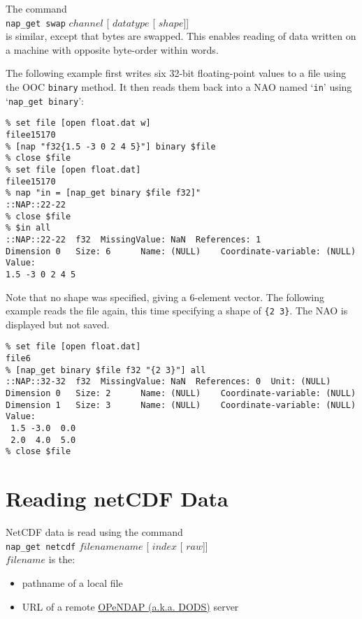The command
  \\
  \texttt{nap\_get swap} 
  $channel$ [
  $datatype$ [
  $shape$]]
  \\is similar, except that bytes are swapped. This enables reading
  of data written on a machine with opposite byte-order within
  words.
  

The following example first writes six 32-bit floating-point
  values to a file using the OOC 
  \texttt{binary} method. It then reads them back into a NAO named
  `\texttt{in}' using `\texttt{nap\_get binary}':
  \begin{verbatim}
% set file [open float.dat w]
filee15170
% [nap "f32{1.5 -3 0 2 4 5}"] binary $file
% close $file
% set file [open float.dat]
filee15170
% nap "in = [nap_get binary $file f32]"
::NAP::22-22
% close $file
% $in all
::NAP::22-22  f32  MissingValue: NaN  References: 1
Dimension 0   Size: 6      Name: (NULL)    Coordinate-variable: (NULL)
Value:
1.5 -3 0 2 4 5
\end{verbatim}

Note that no shape was specified, giving a 6-element vector. The
following example reads the file again, this time specifying a shape of
  \texttt{\{2 3\}}. The NAO is displayed but not saved.
  \begin{verbatim}
% set file [open float.dat]
file6
% [nap_get binary $file f32 "{2 3}"] all
::NAP::32-32  f32  MissingValue: NaN  References: 0  Unit: (NULL)
Dimension 0   Size: 2      Name: (NULL)    Coordinate-variable: (NULL)
Dimension 1   Size: 3      Name: (NULL)    Coordinate-variable: (NULL)
Value:
 1.5 -3.0  0.0
 2.0  4.0  5.0
% close $file
\end{verbatim}

  \section{
    \label{Reading-netCDF-Data}Reading netCDF Data
  }

  

NetCDF data is read using the command
  \\
  \texttt{nap\_get netcdf} 
  $filename name$ [
  $index$ [
  $raw$]]
  \\
  


  $filename$ is the:
  \begin{itemize}
    \item pathname of a local file
    \item URL of a remote 
    \href{http://www.opendap.org/}{OPeNDAP (a.k.a. DODS)}
    server
  \end{itemize}
  


